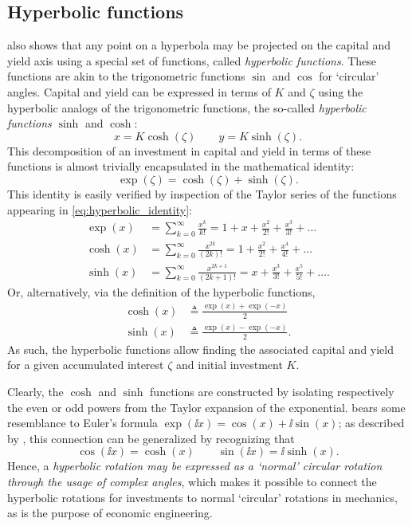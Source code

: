 \subsection{Hyperbolic functions}
 also shows that any point on a hyperbola may be projected on the capital and yield axis using a special set of functions, called \emph{hyperbolic functions}. These functions are akin to the trigonometric functions $\sin$ and $\cos$ for `circular' angles. Capital and yield can be expressed in terms of $K$ and $\zeta$ using the hyperbolic analogs of the trigonometric functions, the so-called \emph{hyperbolic functions} $\sinh$ and $\cosh$:
$$
        x = K\cosh(\zeta) \qquad y = K\sinh(\zeta).
$$
This decomposition of an investment in capital and yield in terms of these functions is almost trivially encapsulated in the mathematical identity:
\begin{equation}
    \exp(\zeta) = \cosh(\zeta) + \sinh(\zeta).
    \label{eq:hyperbolic_identity}
\end{equation}
This identity is easily verified by inspection of the Taylor series of the functions appearing in \cref{eq:hyperbolic_identity}:
\begin{equation}
    \begin{split}
        \exp(x) &= \sum_{k = 0}^\infty \frac{x^k}{k!} = 1 + x + \frac{x^2}{2!} + \frac{x^3}{3!} + \ldots\\
        \cosh(x) &= \sum_{k = 0}^\infty \frac{x^{2k}}{(2k)!} = 1 + \frac{x^2}{2!} + \frac{x^4}{4!} + \ldots\\
        \sinh(x) &= \sum_{k = 0}^\infty \frac{x^{2k + 1}}{(2k + 1)!} = x + \frac{x^3}{3!} + \frac{x^5}{5!} + \ldots.
    \end{split}
\end{equation}
Or, alternatively, via the definition of the hyperbolic functions,
\begin{equation}
    \begin{split}
        \cosh(x) &\triangleq \frac{\exp(x) + \exp(-x)}{2}\\
        \sinh(x) &\triangleq \frac{\exp(x) - \exp(-x)}{2}.
    \end{split}
\end{equation}
As such, the hyperbolic functions allow finding the associated capital and yield for a given accumulated interest $\zeta$ and initial investment $K$.

Clearly, the \(\cosh\) and \(\sinh\) functions are constructed by isolating respectively the even or odd powers from the Taylor expansion of the exponential.  bears some resemblance to Euler's formula \(\exp(\ii x) = \cos(x) + \ii \sin(x)\); as described by \citet{Needham1997}, this connection can be generalized by recognizing that
\begin{equation}
     \cos(\ii x) = \cosh(x) \qquad \sin(\ii x) = \ii\sinh(x).
     \label{eq:trig_functions}
\end{equation}
Hence, a \emph{hyperbolic rotation may be expressed as a `normal' circular rotation through the usage of complex angles}, which makes it possible to connect the hyperbolic rotations for investments to normal `circular' rotations in mechanics, as is the purpose of economic engineering.


